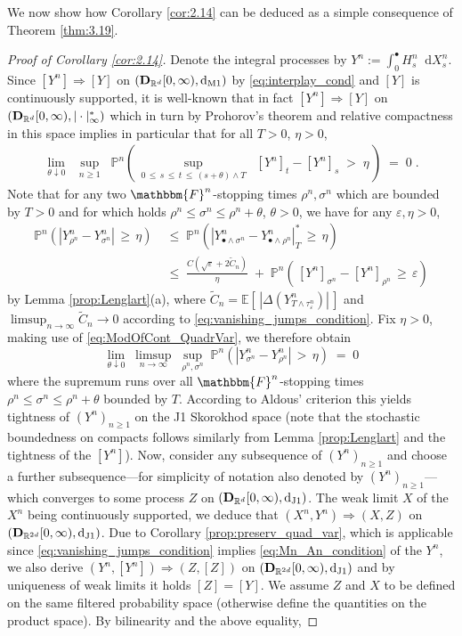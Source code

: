 \documentclass[11pt]{article}
\theoremstyle{definition}\newtheorem{example}[theorem]{Example}
\theoremstyle{definition}\newtheorem{counterexample}[theorem]{Counterexample}
\theoremstyle{definition}\newtheorem{remark}[theorem]{Remark}
\theoremstyle{definition}\newtheorem{defi}[theorem]{Definition}
\numberwithin{equation}{section}
\newcommand{\R}{\mathbb{R}}
\newcommand{\D}{{\bf D}}											%
\newcommand*\diff{\mathop{}\!\mathrm{d}}								%
\newcommand{\E}{\mathbb{E}}											%
\newcommand{\Pro}{\mathbb{P}}										%
\renewcommand{\sup}[1]{\underset{#1}{\operatorname{sup}}\;}					%
\renewcommand{\|}{\; : \, \;}											%
\newcommand{\dJ}{\diff_{\operatorname{J1}}}								%
\newcommand{\dM}{\diff_{\operatorname{M1}}}							%
\begin{document}
We now show how Corollary \ref{cor:2.14} can be deduced as a simple consequence of Theorem \ref{thm:3.19}.
\begin{proof}[Proof of Corollary \ref{cor:2.14}]
	Denote the integral processes by $Y^n:= \int_0^\bullet H^n_s \diff X^n_s$. Since $[Y^n] \Rightarrow [Y]$ on $(\D_{\R^d}[0,\infty), \dM)$ by \eqref{eq:interplay_cond} and $[Y]$ is continuously supported, it is well-known that in fact $[Y^n] \Rightarrow [Y]$ on $(\D_{\R^d}[0,\infty), |\cdot|^*_\infty)$ which in turn by Prohorov's theorem and relative compactness in this space implies in particular that for all $T>0$, $\eta >0$,
	\begin{align} \lim\limits_{\theta \downarrow 0} \; \; \sup{n\ge 1}\; \Pro^n \left( \, \sup{0\, \le \, s \, \le \, t \, \le \, (s+\theta) \wedge T} \; [Y^n]_t- [Y^n]_s \; > \; \eta \, \right) \; = \; 0 \; . \label{eq:ModOfCont_QuadrVar}\end{align}
	Note that for any two $\mathbbm{F}^n$-stopping times $\rho^n, \sigma^n $ which are bounded by $T>0$ and for which holds $\rho^n\le \sigma^n \le \rho^n +\theta$, $\theta>0$, we have for any $\varepsilon, \eta>0$,
	\begin{align*}
		\Pro^n \left( |Y^n_{\rho^n} - Y^n_{\sigma^n}|\, \ge \, \eta \right) \; &\le \; \Pro^n \left( |Y^n_{\bullet \wedge \sigma^n} - Y^n_{\bullet \wedge \rho^n}|^*_T \, \ge \, \eta \right) \\ &\le \;  \frac{C(\sqrt{\varepsilon} + 2\tilde C_n)}{\eta}\; + \; \Pro^n \left( \, [Y^n]_{\sigma^n} - [Y^n]_{\rho^n} \, \ge \, \varepsilon \right)
	\end{align*}
	by Lemma \ref{prop:Lenglart}(a), where $\tilde{C}_n=\E[\, |\Delta (Y^n_{T\wedge \tau^n_\varepsilon})|\,]$ and $\limsup_{n\to \infty} \tilde{C}_n \to 0$ according to \eqref{eq:vanishing_jumps_condition}. Fix $\eta>0$,  making use of \eqref{eq:ModOfCont_QuadrVar}, we therefore obtain 
	$$\lim\limits_{\theta \downarrow 0} \; \limsup\limits_{n\to \infty} \; \sup{\rho^n, \sigma^n} \Pro^n \left( |Y^n_{\sigma^n} - Y^n_{\rho^n}| \, > \, \eta \right) \; = \; 0$$
	where the supremum runs over all $\mathbbm{F}^n$-stopping times $\rho^n\le \sigma^n \le \rho^n+\theta$ bounded by $T$. According to Aldous' criterion \cite[Thm.~VI.4.5]{shiryaev} this yields tightness of $(Y^n)_{n\ge 1}$ on the J1 Skorokhod space (note that the stochastic boundedness on compacts follows similarly from Lemma \ref{prop:Lenglart} and the tightness of the $[Y^n]$). Now, consider any subsequence of $(Y^n)_{n\ge 1}$ and choose a further subsequence---for simplicity of notation also denoted by $(Y^n)_{n\ge 1}$---which converges to some process $Z$ on $(\D_{\R^d}[0,\infty), \dJ)$. The weak limit $X$ of the $X^n$ being continuously supported, we deduce that $(X^n, Y^n) \Rightarrow (X, Z)$ on $(\D_{\R^{2d}}[0,\infty), \dJ)$. Due to Corollary \ref{prop:preserv_quad_var}, which is applicable since \eqref{eq:vanishing_jumps_condition} implies \eqref{eq:Mn_An_condition} of the $Y^n$, we also derive $(Y^n, [Y^n]) \Rightarrow (Z, [Z])$ on $(\D_{\R^{2d}}[0,\infty), \dJ)$ and by uniqueness of weak limits it holds $[Z]=[Y]$. We assume $Z$ and $X$ to be defined on the same filtered probability space (otherwise define the quantities on the product space). By bilinearity and the above equality,

\end{proof}
\end{document}
